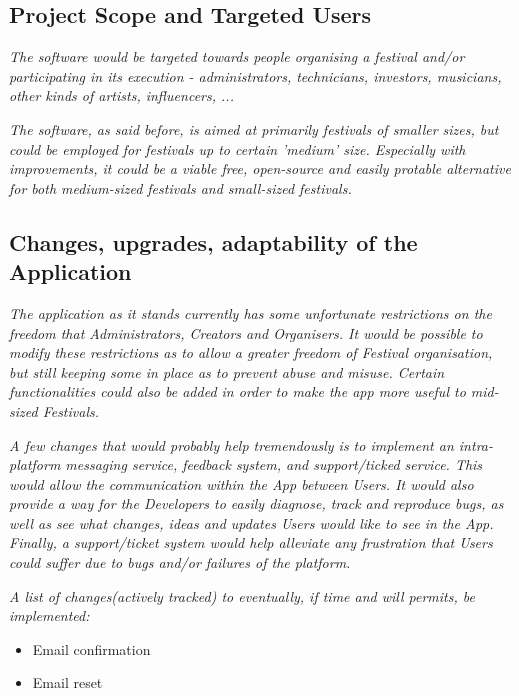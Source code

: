 	\subsection{Project Scope and Targeted Users}
	\textit{The software would be targeted towards people organising a festival and/or participating in its execution - administrators, technicians, investors, musicians, other kinds of artists, influencers, ...}
	
	\textit{The software, as said before, is aimed at primarily festivals of smaller sizes, but could be employed for festivals up to certain 'medium' size. Especially with improvements, it could be a viable free, open-source and easily protable alternative for both medium-sized festivals and small-sized festivals.}
	
	\subsection{Changes, upgrades, adaptability of the Application}
	\textit{The application as it stands currently has some unfortunate restrictions on the freedom that Administrators, Creators and Organisers. It would be possible to modify these restrictions as to allow a greater freedom of Festival organisation, but still keeping some in place as to prevent abuse and misuse. Certain functionalities could also be added in order to make the app more useful to mid-sized Festivals.}
	
	\textit{A few changes that would probably help tremendously is to implement an intra-platform messaging service, feedback system, and support/ticked service. This would allow the communication within the App between Users. It would also provide a way for the Developers to easily diagnose, track and reproduce bugs, as well as see what changes, ideas and updates Users would like to see in the App. Finally, a support/ticket system would help alleviate any frustration that Users could suffer due to bugs and/or failures of the platform.}
	
	\textit{A list of changes(actively tracked) to eventually, if time and will permits, be implemented:}
	\begin{itemize}
		\item Email confirmation
		\item Email reset
	\end{itemize}
\eject


